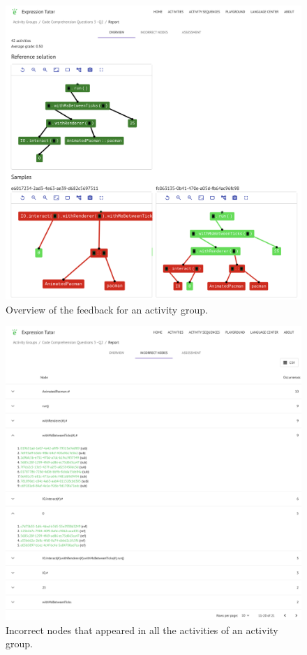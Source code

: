 \begin{chapterBody}
\begin{figure}[ht]
    \centering
    \includegraphics[width=\textwidth]{res/7/sf_overview_same_refsol.png}
    \caption{Overview of the feedback for an activity group.}
    \label{fig:fb-sf-overview}
\end{figure}

\begin{figure}[ht]
    \centering
    \includegraphics[width=\textwidth]{res/7/sf_incorrect_nodes_table.png}
    \caption{Incorrect nodes that appeared in all the activities of an activity
group.}
    \label{fig:fb-sf-incorrect-nodes}
\end{figure}


\end{chapterBody}
